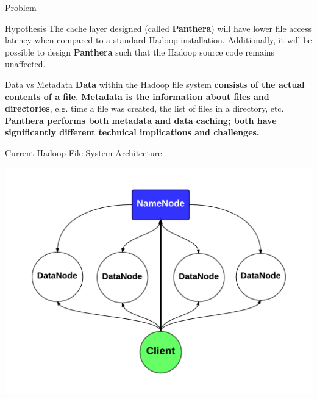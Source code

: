 \documentclass[final]{beamer} %
\begin{document}
\begin{frame}
\begin{columns}[t]
\begin{column}{0.32\textwidth}
\begin{block}{Problem}
      \end{block}

      \begin{block}{Hypothesis}
       The cache layer designed (called \textbf{Panthera}) will have lower file
       access latency when compared to a standard Hadoop installation. Additionally, it
       will be possible to design \textbf{Panthera} such that the Hadoop source code
       remains unaffected.
      \end{block}
	  
		\begin{block}{Data vs Metadata}
			\textbf{Data} within the Hadoop file system \textbf{consists of the actual contents of a file.}
			\textbf{Metadata is the information about files and directories}, e.g. time a file was created, the list of files in a directory, etc. \textbf{Panthera performs both metadata
			and data caching; both have significantly different technical implications
			and challenges.}
		\end{block}
	
		\begin{block}{Current Hadoop File System Architecture}
			\centerline{\includegraphics[scale=1.5]{assets/vanilla_hadoop.pdf}}
		\end{block}
		

\end{column}
\end{columns}
\end{frame}
\end{document}
